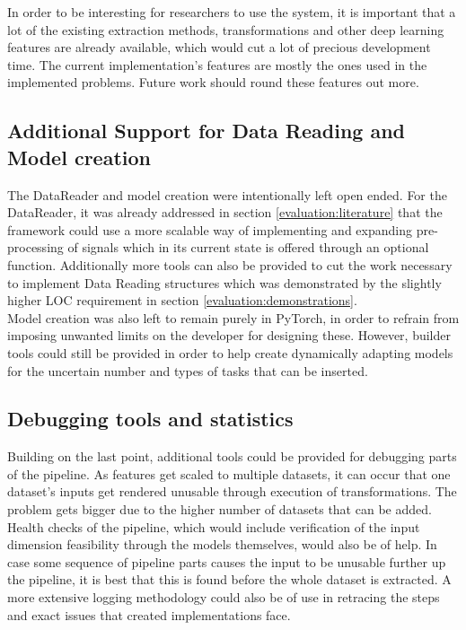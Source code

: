 In order to be interesting for researchers to use the system, it is important that a lot of the existing extraction methods, transformations and other deep learning features are already available, which would cut a lot of precious development time. The current implementation's features are mostly the ones used in the implemented problems. Future work should round these features out more.

\subsection{Additional Support for Data Reading and Model creation}

The DataReader and model creation were intentionally left open ended. For the DataReader, it was already addressed in section \ref{evaluation:literature} that the framework could use a more scalable way of implementing and expanding pre-processing of signals which in its current state is offered through an optional function. Additionally more tools can also be provided to cut the work necessary to implement Data Reading structures which was demonstrated by the slightly higher LOC requirement in section \ref{evaluation:demonstrations}. \\

Model creation was also left to remain purely in PyTorch, in order to refrain from imposing unwanted limits on the developer for designing these. However, builder tools could still be provided in order to help create dynamically adapting models for the uncertain number and types of tasks that can be inserted.\\

\subsection{Debugging tools and statistics}

Building on the last point, additional tools could be provided for debugging parts of the pipeline. As features get scaled to multiple datasets, it can occur that one dataset's inputs get rendered unusable through execution of transformations. The problem gets bigger due to the higher number of datasets that can be added. Health checks of the pipeline, which would include verification of the input dimension feasibility through the models themselves, would also be of help. In case some sequence of pipeline parts causes the input to be unusable further up the pipeline, it is best that this is found before the whole dataset is extracted. A more extensive logging methodology could also be of use in retracing the steps and exact issues that created implementations face.\\

